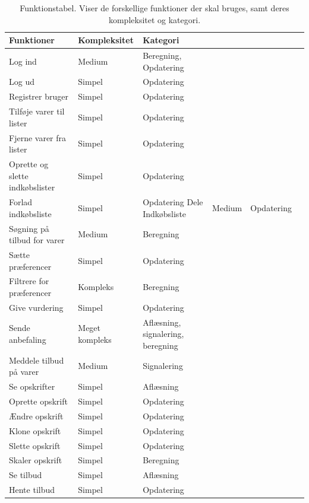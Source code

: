 \begin{table}[H]
  \centering
      \begin{tabular}{l|lllll}
      \textbf{Funktioner}			& {Kompleksitet}	& {Kategori}  	\\ \hline
      Log ind						& Medium			& Beregning, Opdatering		\\
      Log ud						& Simpel			& Opdatering	\\
      Registrer bruger				& Simpel			& Opdatering	\\
      Tilføje varer til lister		& Simpel       		& Opdatering	\\
      Fjerne varer fra lister		& Simpel       		& Opdatering	\\
      Oprette og slette indkøbslister & Simpel       	& Opdatering	\\
      Forlad indkøbsliste			& Simpel			& Opdatering
      Dele Indkøbsliste				& Medium       		& Opdatering	\\
      Søgning på tilbud for varer   & Medium     		& Beregning		\\
      Sætte præferencer				& Simpel       		& Opdatering	\\
      Filtrere for præferencer		& Kompleks     		& Beregning		\\
      Give vurdering				& Simpel       		& Opdatering	\\
      Sende anbefaling				& Meget kompleks	& Aflæsning, signalering, beregning		\\
      Meddele tilbud på varer		& Medium      		& Signalering	\\
	  Se opskrifter					& Simpel       		& Aflæsning		\\
      Oprette opskrift      		& Simpel            & Opdatering  	\\
      Ændre opskrift        		& Simpel            & Opdatering	\\
      Klone	opskrift       			& Simpel            & Opdatering 	\\
      Slette opskrift				& Simpel			& Opdatering	\\
      Skaler opskrift				& Simpel			& Beregning		\\
	  Se tilbud						& Simpel       		& Aflæsning		\\
      Hente tilbud					& Simpel	       	& Opdatering	\\
    \end{tabular}
  \caption{Funktionstabel. Viser de forskellige funktioner der skal bruges, samt deres kompleksitet og kategori.}\label{tabel:functionstable}
\end{table}

